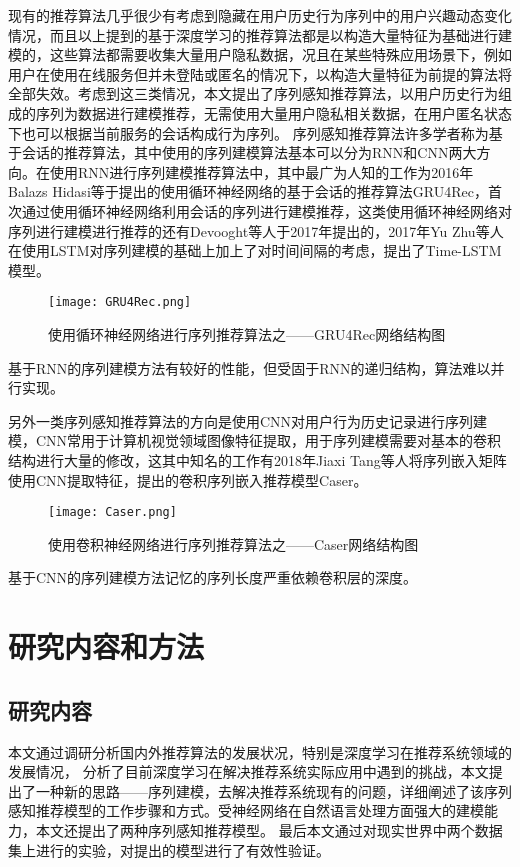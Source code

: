 现有的推荐算法几乎很少有考虑到隐藏在用户历史行为序列中的用户兴趣动态变化情况，而且以上提到的基于深度学习的推荐算法都是以构造大量特征为基础进行建模的，这些算法都需要收集大量用户隐私数据，况且在某些特殊应用场景下，例如用户在使用在线服务但并未登陆或匿名的情况下，以构造大量特征为前提的算法将全部失效。考虑到这三类情况，本文提出了序列感知推荐算法，以用户历史行为组成的序列为数据进行建模推荐，无需使用大量用户隐私相关数据，在用户匿名状态下也可以根据当前服务的会话构成行为序列。
序列感知推荐算法许多学者称为基于会话的推荐算法，其中使用的序列建模算法基本可以分为RNN和CNN两大方向。在使用RNN进行序列建模推荐算法中，其中最广为人知的工作为2016年Balazs Hidasi等于提出的使用循环神经网络的基于会话的推荐算法GRU4Rec，首次通过使用循环神经网络利用会话的序列进行建模推荐，这类使用循环神经网络对序列进行建模进行推荐的还有Devooght等人于2017年提出的，2017年Yu Zhu等人在使用LSTM对序列建模的基础上加上了对时间间隔的考虑，提出了Time-LSTM模型。
\begin{figure}[htb]
  \centering
  \texttt{[image: GRU4Rec.png]}\\
  \caption{使用循环神经网络进行序列推荐算法之——GRU4Rec网络结构图}
  \label{fig:GRU4Rec}
\end{figure}
基于RNN的序列建模方法有较好的性能，但受固于RNN的递归结构，算法难以并行实现。

另外一类序列感知推荐算法的方向是使用CNN对用户行为历史记录进行序列建模，CNN常用于计算机视觉领域图像特征提取，用于序列建模需要对基本的卷积结构进行大量的修改，这其中知名的工作有2018年Jiaxi Tang等人将序列嵌入矩阵使用CNN提取特征，提出的卷积序列嵌入推荐模型Caser。
\begin{figure}[htb]
  \centering
  \texttt{[image: Caser.png]}\\
  \caption{使用卷积神经网络进行序列推荐算法之——Caser网络结构图}
  \label{fig:Caser}
\end{figure}
基于CNN的序列建模方法记忆的序列长度严重依赖卷积层的深度。

\section{研究内容和方法}
\subsection{研究内容}
本文通过调研分析国内外推荐算法的发展状况，特别是深度学习在推荐系统领域的发展情况，
分析了目前深度学习在解决推荐系统实际应用中遇到的挑战，本文提出了一种新的思路——序列建模，去解决推荐系统现有的问题，详细阐述了该序列感知推荐模型的工作步骤和方式。受神经网络在自然语言处理方面强大的建模能力，本文还提出了两种序列感知推荐模型。
最后本文通过对现实世界中两个数据集上进行的实验，对提出的模型进行了有效性验证。

